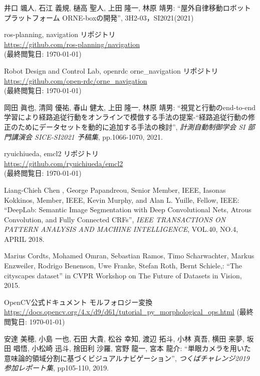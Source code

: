 \documentclass[uplatex, twocolumn, 9pt]{jsproceedings}
\begin{document}
\footnotesize
\begin{thebibliography}{99}

井口 颯人, 石江 義規, 樋高 聖人, 上田 隆一, 林原 靖男: ``屋外自律移動ロボットプラットフォーム ORNE-boxの開発'', 3H2-03，SI2021(2021)

ros-planning, navigation リポジトリ\\
\url{https://github.com/ros-planning/navigation}\\
(最終閲覧日: \today)

Robot Design and Control Lab, openrdc orne\_navigation リポジトリ\\
\url{https://github.com/open-rdc/orne_navigation}\\
(最終閲覧日: \today)

岡田 眞也, 清岡 優祐, 春山 健太, 上田 隆一, 林原 靖男: ``視覚と行動のend-to-end学習により経路追従行動をオンラインで模倣する手法の提案-“経路追従行動の修正のためにデータセットを動的に追加する手法の検討'', \textit{計測自動制御学会 SI 部門講演会 SICE-SI2021 予稿集}, pp.1066-1070, 2021.

ryuichiueda, emcl2 リポジトリ\\
\url{https://github.com/ryuichiueda/emcl2}\\
(最終閲覧日: \today)

Liang-Chieh Chen , George Papandreou, Senior Member, IEEE, Iasonas Kokkinos, Member, IEEE,
Kevin Murphy, and Alan L. Yuille, Fellow, IEEE: ``DeepLab: Semantic Image Segmentation with
Deep Convolutional Nets, Atrous Convolution, and Fully Connected CRFs'', \textit{IEEE TRANSACTIONS ON PATTERN ANALYSIS AND MACHINE INTELLIGENCE}, VOL.40, NO.4, APRIL 2018.

Marius Cordts, Mohamed Omran, Sebastian Ramos, Timo Scharwachter, Markus Enzweiler, Rodrigo Benenson, Uwe Franke, Stefan Roth, Bernt Schiele,: ``The cityscapes dataset'' in CVPR Workshop on The Future of Datasets in Vision, 2015.

OpenCV公式ドキュメント モルフォロジー変換\\
\url{https://docs.opencv.org/4.x/d9/d61/tutorial_py_morphological_ops.html}
(最終閲覧日: \today)

安達 美穂, 小島 一也, 石田 大貴, 松谷 幸知, 渡辺 拓斗, 小林 真吾, 横田 来夢, 坂田 唱悟, 小松崎 迅斗, 捨田利 沙羅, 宮野 龍一, 宮本 龍介: ``単眼カメラを用いた意味論的領域分割に基づくビジュアルナビゲーション'', \textit{つくばチャレンジ2019 参加レポート集}, pp105-110, 2019.


\end{thebibliography}
\end{document}
